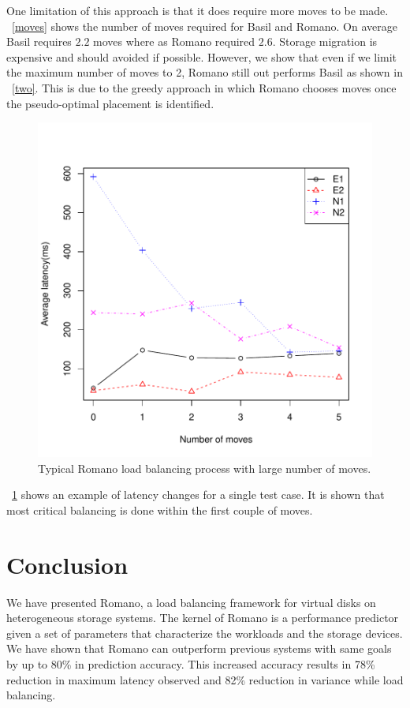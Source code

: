 One limitation of this approach is that it does require more moves to be made.
\figurename~\ref{moves} shows the number of moves required for Basil and Romano.
On average Basil requires $2.2$ moves where as Romano required $2.6$.
Storage migration is expensive and should avoided if possible.
However, we show that even if we limit the maximum number of moves to 2, Romano still out performs Basil as shown in \figurename~\ref{two}.
This is due to the greedy approach in which Romano chooses moves once the pseudo-optimal placement is identified.
\begin{figure}
\centering
\includegraphics[width=\textwidth]{figure/23latency_reduction.pdf}
\caption{Typical Romano load balancing process with large number of moves.}
\label{proc}
\end{figure}
\figurename~\ref{proc} shows an example of latency changes for a single test case.
It is shown that most critical balancing is done within the first couple of moves.
~
\section{Conclusion}\label{CONCL}
We have presented Romano, a load balancing framework for virtual disks
on heterogeneous storage systems. The kernel of Romano is a performance
predictor given a set of parameters that characterize the workloads and
the storage devices. We have shown that Romano can outperform
previous systems with same goals by up to 80\% in prediction
accuracy. This increased accuracy results in 78\% reduction in maximum
latency observed and 82\% reduction in variance while load balancing.

